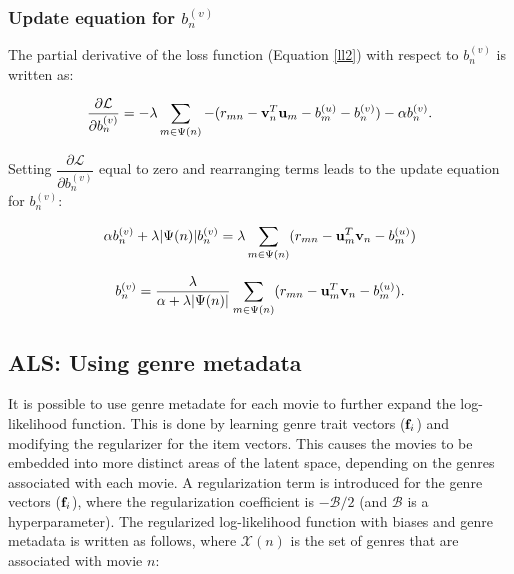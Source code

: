 \documentclass{article}
\begin{document}
\subsubsection{Update equation for $b_{n}^{(v)}$}

The partial derivative of the loss function (Equation \ref{ll2}) with respect to $b_{n}^{(v)}$ is written as:

\[
    \dfrac{\partial \mathcal{L}}{\partial b_{n}^{(v)}} 
    = -\lambda \sum\limits_{m \in \Psi(n)} -(r_{mn} - \vb{v}_{n}^{T} \vb{u}_{m} - b_{m}^{(u)} - b_{n}^{(v)}) - \alpha b_{n}^{(v)}\text{.}
\]

Setting $\dfrac{\partial \mathcal{L}}{\partial b_{n}^{(v)}}$ equal to zero and rearranging terms leads to the update equation for $b_{n}^{(v)}$:

\[
    \alpha b_{n}^{(v)} + \lambda |\Psi(n)| b_{n}^{(v)} = \lambda \sum\limits_{m \in \Psi(n)} (r_{mn} - \vb{u}_{m}^{T} \vb{v}_{n} - b_{m}^{(u)})
\]

\begin{equation}
    \begin{split}
       b_{n}^{(v)} = \dfrac{\lambda}{\alpha + \lambda |\Psi(n)|} \sum\limits_{m \in \Psi(n)} (r_{mn} - \vb{u}_{m}^{T} \vb{v}_{n} - b_{m}^{(u)})\text{.}
    \end{split}
\end{equation}



\subsection{ALS: Using genre metadata} \label{bruh}
It is possible to use genre metadate for each movie to further expand the log-likelihood function. 
This is done by learning genre trait vectors ($\vb{f}_i$) and modifying the regularizer for the item vectors.
This causes the movies to be embedded into more distinct areas of the latent space, depending on the genres associated
with each movie. A regularization term is introduced for the genre vectors ($\vb{f}_i$), where the regularization 
coefficient is $-\mathcal{B}/2$ (and $\mathcal{B}$ is a hyperparameter). The regularized 
log-likelihood function with biases and genre metadata is written as follows, where $\mathcal{X}(n)$ is the set of
genres that are associated with movie $n$:
\end{document}
